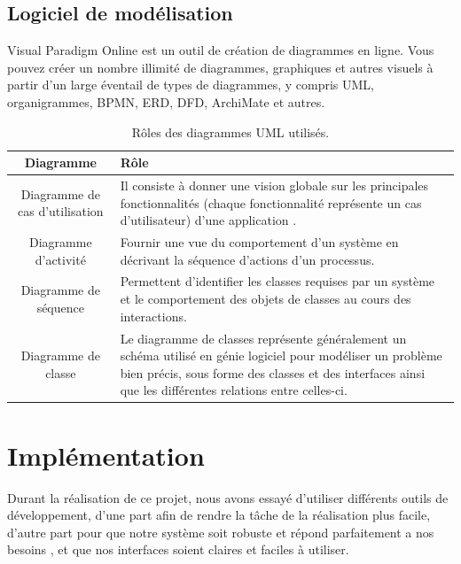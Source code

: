 \subsection{Logiciel de modélisation} 
Visual Paradigm Online est un outil de création de diagrammes en ligne. Vous pouvez créer un nombre illimité de diagrammes, graphiques et autres visuels à partir d’un large éventail de types de diagrammes, y compris UML, organigrammes, BPMN, ERD, DFD, ArchiMate et autres.\newline\newline
\begin{table}
		
	\caption{Rôles des diagrammes UML utilisés.}
	\label{table:kysymys}
\begin{tabular}{|c|p{11cm}|}
	
	\hline
	\large \bfseries Diagramme & \large \bfseries Rôle\\
	\hline
	Diagramme de cas d’utilisation & Il consiste à donner une vision globale sur les principales fonctionnalités
	(chaque fonctionnalité représente un cas d’utilisateur) d’une application .  \\
	\hline
	Diagramme d’activité &  Fournir une vue du comportement d'un système en décrivant la séquence d'actions d'un processus.    \\
	\hline
	Diagramme de séquence &Permettent d'identifier les classes requises par un système et le comportement des objets de classes au cours des interactions.  \\
	\hline
	Diagramme de classe    &Le diagramme de classes représente généralement un schéma utilisé en génie
	logiciel pour modéliser un problème bien précis, sous forme des classes et des
	interfaces ainsi que les différentes relations entre celles-ci. \\
	\hline
\end{tabular}
\end{table}
\section{Implémentation}
Durant la réalisation de ce projet, nous avons essayé d’utiliser différents
outils de développement, d’une part afin de rendre la tâche de la
réalisation plus facile, d’autre part pour que notre système soit robuste et
répond parfaitement a nos besoins , et que nos interfaces soient claires et
faciles à utiliser.
